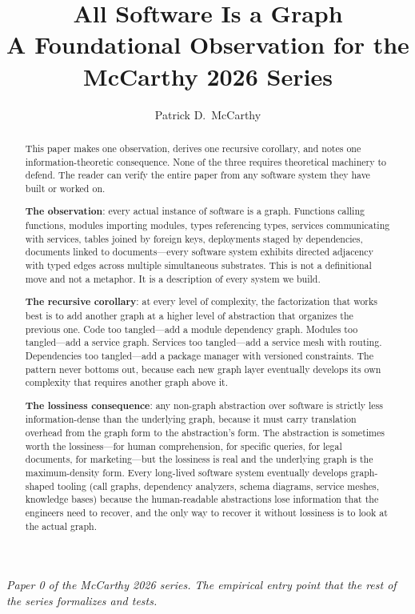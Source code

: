 \documentclass[11pt]{article}
\title{All Software Is a Graph\\
\large A Foundational Observation for the McCarthy 2026 Series}
\author{Patrick D.\ McCarthy}
\date{}
\begin{document}
\maketitle

\begin{center}
\textit{Paper 0 of the McCarthy 2026 series. The empirical entry point that the rest of the series formalizes and tests.}
\end{center}

\begin{abstract}
This paper makes one observation, derives one recursive corollary, and notes one information-theoretic consequence. None of the three requires theoretical machinery to defend. The reader can verify the entire paper from any software system they have built or worked on.

\textbf{The observation}: every actual instance of software is a graph. Functions calling functions, modules importing modules, types referencing types, services communicating with services, tables joined by foreign keys, deployments staged by dependencies, documents linked to documents---every software system exhibits directed adjacency with typed edges across multiple simultaneous substrates. This is not a definitional move and not a metaphor. It is a description of every system we build.

\textbf{The recursive corollary}: at every level of complexity, the factorization that works best is to add another graph at a higher level of abstraction that organizes the previous one. Code too tangled---add a module dependency graph. Modules too tangled---add a service graph. Services too tangled---add a service mesh with routing. Dependencies too tangled---add a package manager with versioned constraints. The pattern never bottoms out, because each new graph layer eventually develops its own complexity that requires another graph above it.

\textbf{The lossiness consequence}: any non-graph abstraction over software is strictly less information-dense than the underlying graph, because it must carry translation overhead from the graph form to the abstraction's form. The abstraction is sometimes worth the lossiness---for human comprehension, for specific queries, for legal documents, for marketing---but the lossiness is real and the underlying graph is the maximum-density form. Every long-lived software system eventually develops graph-shaped tooling (call graphs, dependency analyzers, schema diagrams, service meshes, knowledge bases) because the human-readable abstractions lose information that the engineers need to recover, and the only way to recover it without lossiness is to look at the actual graph.


\end{abstract}
\end{document}
